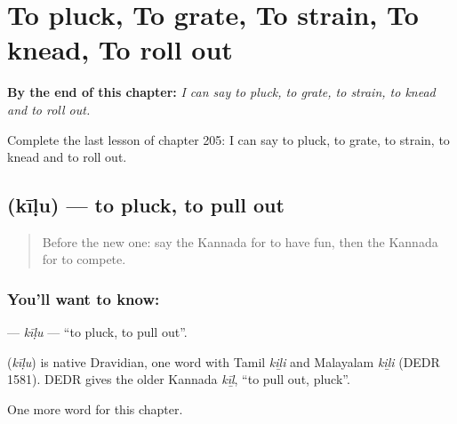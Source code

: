 
\chapter{To pluck, To grate, To strain, To knead, To roll out}
\label{ch:ka-to-pluck-to-grate-to-strain-to-knead-to-roll-out}

\begin{chapteropening}
\textbf{By the end of this chapter:} \emph{I can say to pluck, to grate, to strain, to knead and to roll out.}

Complete the last lesson of chapter 205: I can say to pluck, to grate, to strain, to knead and to roll out.
\end{chapteropening}

\section[\texorpdfstring{\kn{ಕೀಳು} (kīḷu)}{ಕೀಳು (kīḷu)}]{ (kīḷu) — to pluck, to pull out}

\label{lesson:KA-C205-kilu}



\begin{quote}
Before the new one: say the Kannada for to have fun, then the Kannada for to compete.
\end{quote}

\subsection*{You'll want to know: }
\textbf{} — \emph{kīḷu} — \textquotedblleft{}to pluck, to pull out\textquotedblright{}.

\begin{cousinweb}
\textbf{} (\emph{kīḷu}) is native Dravidian, one word with Tamil \emph{kiḻi} and Malayalam \emph{kiḻi} (DEDR 1581). DEDR gives the older Kannada \emph{kīḻ}, \textquotedblleft{}to pull out, pluck\textquotedblright{}.
\end{cousinweb}

\begin{grammarlens}[title={What you've built}]
One more word for this chapter.
\end{grammarlens}

